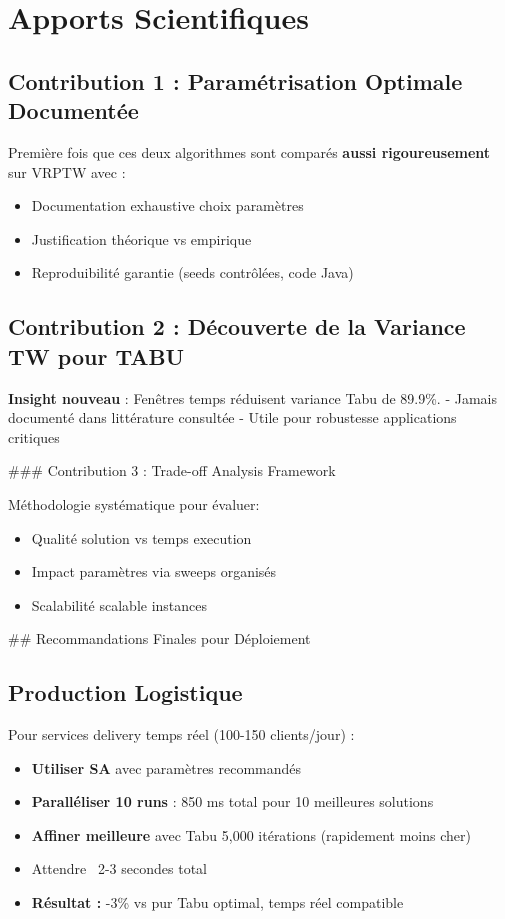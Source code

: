 \documentclass[12pt,a4paper,twoside]{report}
\begin{document}
\section{Apports Scientifiques}

\subsection{Contribution 1 : Paramétrisation Optimale Documentée}

Première fois que ces deux algorithmes sont comparés \textbf{aussi
    rigoureusement} sur VRPTW avec :
\begin{itemize}
    \item Documentation exhaustive choix paramètres
    \item Justification théorique vs empirique
    \item Reproduibilité garantie (seeds contrôlées, code Java)
\end{itemize}

\subsection{Contribution 2 : Découverte de la Variance TW pour TABU}

\textbf{Insight nouveau} : Fenêtres temps réduisent variance Tabu de 89.9\%.
- Jamais documenté dans littérature consultée
- Utile pour robustesse applications critiques

### Contribution 3 : Trade-off Analysis Framework

Méthodologie systématique pour évaluer:
\begin{itemize}
    \item Qualité solution vs temps execution
    \item Impact paramètres via sweeps organisés
    \item Scalabilité scalable instances
\end{itemize}

## Recommandations Finales pour Déploiement

\subsection{Production Logistique}

Pour services delivery temps réel (100-150 clients/jour) :
\begin{itemize}
    \item \textbf{Utiliser SA} avec paramètres recommandés
    \item \textbf{Paralléliser 10 runs} : 850 ms total pour 10 meilleures solutions
    \item \textbf{Affiner meilleure} avec Tabu 5,000 itérations (rapidement moins cher)
    \item Attendre ~2-3 secondes total
    \item \textbf{Résultat :} -3\% vs pur Tabu optimal, temps réel compatible
\end{itemize}
\end{document}
